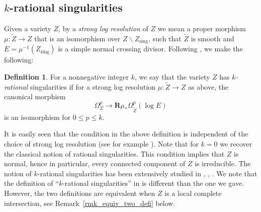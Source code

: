 \documentclass[11pt]{article}
\numberwithin{equation}{section}
\theoremstyle{plain}
\theoremstyle{definition}
\newtheorem{defi}[thm]{Definition}
\newcommand\R{{\mathbf R}}
\newcommand\sing{\mathrm{sing}}
\begin{document}
\subsection{$k$-rational singularities}\label{section_k_rational}
Given a variety $Z$, by a \emph{strong log resolution} of $Z$ we mean a proper morphism
$\mu\colon\widetilde{Z}\to Z$ that is an isomorphism over $Z\smallsetminus Z_\sing$, such that $\widetilde{Z}$ is smooth and
$E=\mu^{-1}(Z_\sing)$ is a simple normal crossing divisor.
Following \cite{FL2}, we make the following:

\begin{defi}
For a nonnegative integer $k$, we say that the variety $Z$ has
\emph{$k$\nobreakdash-ra\-tional} singularities if for a strong log resolution $\mu\colon\widetilde{Z}\to Z$ as above,
the canonical morphism\vspace*{-3pt}\enlargethispage{.5\baselineskip}
\begin{equation}\label{eq_def_k_rat}
\Omega_Z^p\to \R\mu_*\Omega^p_{\widetilde{Z}}(\log E)
\end{equation}
is an isomorphism for $0\leq p\leq k$.
\end{defi}

It is easily seen that the condition in the above definition is independent of the choice of strong log resolution (see for example \cite[Lem.\,1.6]{MP2}).
Note that for $k=0$ we recover the classical notion of rational singularities. This condition implies that $Z$ is normal, hence in particular,
every connected component of $Z$ is irreducible.
The notion of $k$-rational singularities has been extensively studied in \cite{FL2}, \cite{FL3}, \cite{MP2}.
We note that the definition of ``$k$-rational singularities'' in \cite{FL2} is different than the one we gave. However, the two definitions are equivalent
when $Z$ is a local complete intersection, see Remark~\ref{rmk_equiv_two_defi} below.
\end{document}
